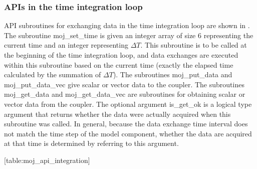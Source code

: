 \hypertarget{apis-in-the-time-integration-loop}{%
\subsubsection{APIs in the time integration
loop}\label{apis-in-the-time-integration-loop}}

API subroutines for exchanging data in the time integration loop are
shown in . The subroutine moj\_set\_time is given an integer array of
size 6 representing the current time and an integer representing
\(\Delta{T}\). This subroutine is to be called at the beginning of the
time integration loop, and data exchanges are executed within this
subroutine based on the current time (exactly the elapsed time
calculated by the summation of \(\Delta{T}\)). The subroutines
moj\_put\_data and moj\_put\_data\_vec give scalar or vector data to the
coupler. The subroutines moj\_get\_data and moj\_get\_data\_vec are
subroutines for obtaining scalar or vector data from the coupler. The
optional argument is\_get\_ok is a logical type argument that returns
whether the data were actually acquired when this subroutine was called.
In general, because the data exchange time interval does not match the
time step of the model component, whether the data are acquired at that
time is determined by referring to this argument.

\protect\hypertarget{table:moj_api_integration}{}{{[}table:moj\_api\_integration{]}}

